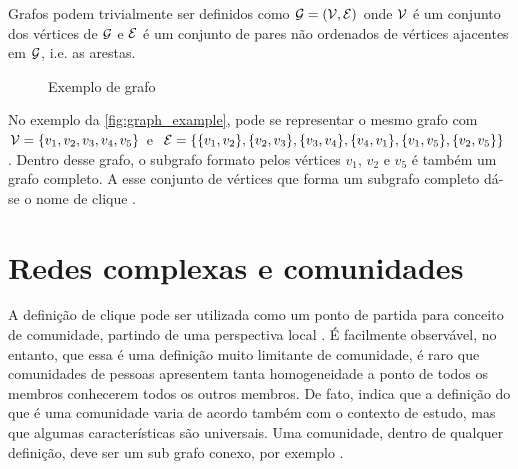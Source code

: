 \documentclass[notes.tex]{subfiles}
\begin{document}
Grafos podem trivialmente ser definidos como $\operatorname{\mathcal{G}} = (\operatorname{\mathcal{V}}, \operatorname{\mathcal{E}})$ onde $\operatorname{\mathcal{V}}$ é um conjunto dos vértices de  $\operatorname{\mathcal{G}}$ e  $\operatorname{\mathcal{E}}$ é um conjunto de pares não ordenados de vértices ajacentes em $\operatorname{\mathcal{G}}$, i.e. as arestas.

\begin{figure}[htpb]
    \centering
    \caption{Exemplo de grafo}\label{fig:graph_example}
\end{figure}

No exemplo da \autoref{fig:graph_example}, pode se representar o mesmo grafo com $\operatorname{\mathcal{V}} = \{v_1, v_2, v_3, v_4, v_5\}$ e $\operatorname{\mathcal{E}} = \{\{v_1, v_2\}, \{v_2, v_3\}, \{v_3, v_4\}, \{v_4, v_1\}, \{v_1, v_5\}, \{v_2, v_5\}\}$.
Dentro desse grafo, o subgrafo formato pelos vértices $v_1$, $v_2$ e $v_5$ é também um grafo completo.
A esse conjunto de vértices que forma um subgrafo completo dá-se o nome de clique \cite{fortunato2010community}.

\section{Redes complexas e comunidades}

A definição de clique pode ser utilizada como um ponto de partida para conceito de comunidade, partindo de uma perspectiva local \cite{fortunato2010community}.
É facilmente observável, no entanto, que essa é uma definição muito limitante de comunidade, é raro que comunidades de pessoas apresentem tanta homogeneidade a ponto de todos os membros conhecerem todos os outros membros.
De fato,  indica que a definição do que é uma comunidade varia de acordo também com o contexto de estudo, mas que algumas características são universais.
Uma comunidade, dentro de qualquer definição, deve ser um sub grafo conexo, por exemplo \cite{fortunato2010community}. 
\end{document}

